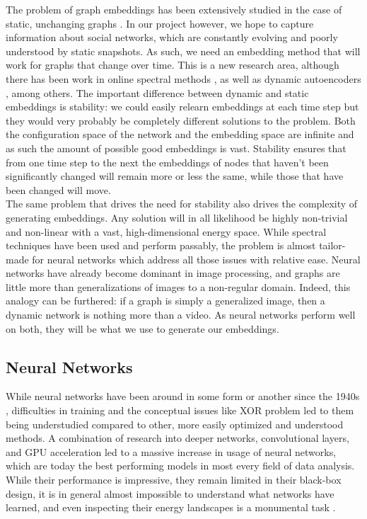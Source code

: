 \documentclass[12pt,twoside]{report}
\begin{document}
The problem of graph embeddings has been extensively studied in the case of static, unchanging graphs \cite{goyal2018graph}. In our project however, we hope to capture information about social networks, which are constantly evolving and poorly understood by static snapshots. As such, we need an embedding method that will work for graphs that change over time. This is a new research area, although there has been work in online spectral methods 
\cite{li2017attributed}, as well as dynamic autoencoders \cite{goyal2018dyngem}, among others. The important difference between dynamic and static embeddings is stability: we could easily relearn embeddings at each time step but they would very probably be completely different solutions to the problem. Both the configuration space of the network and the embedding space are infinite and as such the amount of possible good embeddings is vast. Stability ensures that from one time step to the next the embeddings of nodes that haven't been significantly changed will remain more or less the same, while those that have been changed will move. \\

The same problem that drives the need for stability also drives the complexity of generating embeddings. Any solution will in all likelihood be highly non-trivial and non-linear with a vast, high-dimensional energy space. While spectral techniques have been used and perform passably, the problem is almost tailor-made for neural networks which address all those issues with relative ease. Neural networks have already become dominant in image processing, and graphs are little more than generalizations of images to a non-regular domain. Indeed, this analogy can be furthered: if a graph is simply a generalized image, then a dynamic network is nothing more than a video. As neural networks perform well on both, they will be what we use to generate our embeddings. \\ 

\subsection{Neural Networks}

While neural networks have been around in some form or another since the 1940s \cite{hebb2005organization}, difficulties in training and the conceptual issues like XOR problem led to them being understudied compared to other, more easily optimized and understood methods. A combination of research into deeper networks, convolutional layers, and GPU acceleration led to a massive increase in usage of neural networks, which are today the best performing models in most every field of data analysis. While their performance is impressive, they remain limited in their black-box design, it is in general almost impossible to understand what networks have learned, and even inspecting their energy landscapes is a monumental task \cite{li2018visualizing}. \\
\end{document}
